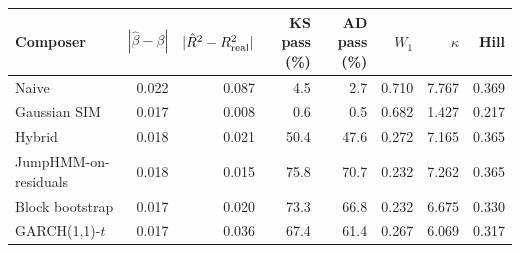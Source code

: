 \begin{tabular}{lrrrrrrr}
\toprule
Composer & $|\hat\beta-\beta|$ & $|\hat R^2 - R^2_{\mathrm{real}}|$ & KS pass (\%) & AD pass (\%) & $W_1$ & $\kappa$ & Hill \\
\midrule
Naive & 0.022 & 0.087 & 4.5 & 2.7 & 0.710 & 7.767 & 0.369 \\
Gaussian SIM & 0.017 & 0.008 & 0.6 & 0.5 & 0.682 & 1.427 & 0.217 \\
Hybrid & 0.018 & 0.021 & 50.4 & 47.6 & 0.272 & 7.165 & 0.365 \\
JumpHMM-on-residuals & 0.018 & 0.015 & 75.8 & 70.7 & 0.232 & 7.262 & 0.365 \\
Block bootstrap & 0.017 & 0.020 & 73.3 & 66.8 & 0.232 & 6.675 & 0.330 \\
GARCH(1,1)-$t$ & 0.017 & 0.036 & 67.4 & 61.4 & 0.267 & 6.069 & 0.317 \\
\bottomrule
\end{tabular}
